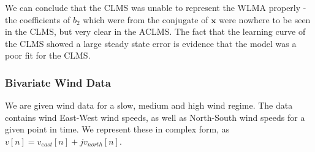 \documentclass[./main.tex]{subfiles}
\begin{document}
We can conclude that the CLMS was unable to represent the WLMA properly - the coefficients of $b_2$ which were from the conjugate of $\mathbf{x}$ were nowhere to be seen in the CLMS, but very clear in the ACLMS. The fact that the learning curve of the CLMS showed a large steady state error is evidence that the model was a poor fit for the CLMS.

\subsubsection{Bivariate Wind Data}

We are given wind data for a slow, medium and high wind regime. The data contains wind East-West wind speeds, as well as North-South wind speeds for a given point in time. We represent these in complex form, as $ v[n] = v_{east}[n] + jv_{north}[n] $. 






%  	


 		
\end{document}
